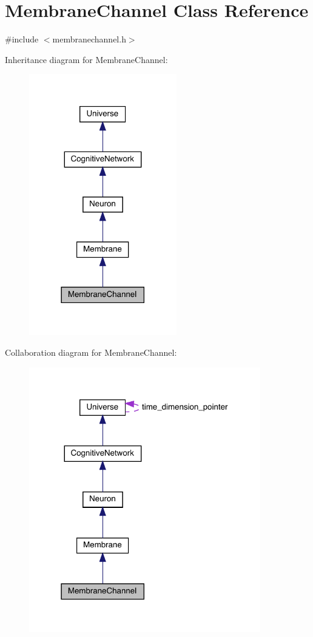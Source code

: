 \hypertarget{class_membrane_channel}{}\section{Membrane\+Channel Class Reference}
\label{class_membrane_channel}


{\ttfamily \#include $<$membranechannel.\+h$>$}



Inheritance diagram for Membrane\+Channel\+:\nopagebreak
\begin{figure}[H]
\begin{center}
\leavevmode
\includegraphics[width=182pt]{class_membrane_channel__inherit__graph}
\end{center}
\end{figure}


Collaboration diagram for Membrane\+Channel\+:\nopagebreak
\begin{figure}[H]
\begin{center}
\leavevmode
\includegraphics[width=286pt]{class_membrane_channel__coll__graph}
\end{center}
\end{figure}
